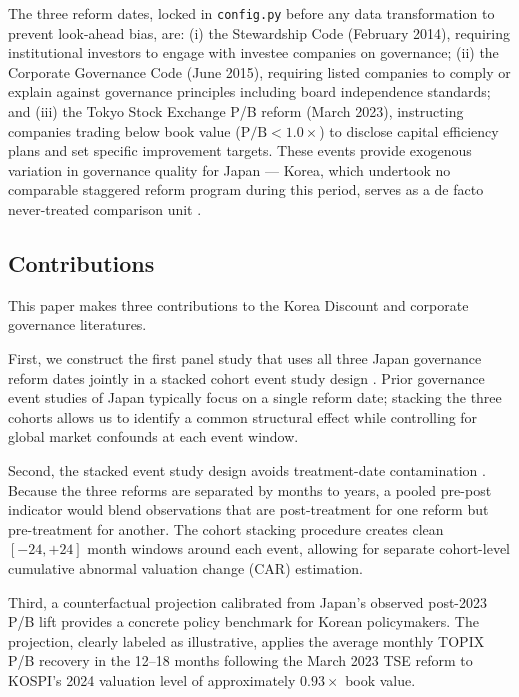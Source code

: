 \documentclass[12pt]{article}
\begin{document}
The three reform dates, locked in \texttt{config.py} before any data transformation to
prevent look-ahead bias, are: (i) the Stewardship Code (February 2014), requiring
institutional investors to engage with investee companies on governance; (ii) the Corporate
Governance Code (June 2015), requiring listed companies to comply or explain against
governance principles including board independence standards; and (iii) the Tokyo Stock
Exchange P/B reform (March 2023), instructing companies trading below book value ($\text{P/B} < 1.0\times$)
to disclose capital efficiency plans and set specific improvement targets. These events provide
exogenous variation in governance quality for Japan --- Korea, which undertook no comparable
staggered reform program during this period, serves as a de facto never-treated comparison
unit \citep{abadie2010, cengiz2019}.

\subsection*{Contributions}

This paper makes three contributions to the Korea Discount and corporate governance
literatures.

First, we construct the first panel study that uses all three Japan governance reform dates
jointly in a stacked cohort event study design \citep{cengiz2019}. Prior governance event
studies of Japan typically focus on a single reform date; stacking the three cohorts allows
us to identify a common structural effect while controlling for global market confounds at
each event window.

Second, the stacked event study design avoids treatment-date contamination \citep{baker2022}.
Because the three reforms are separated by months to years, a pooled pre-post indicator
would blend observations that are post-treatment for one reform but pre-treatment for another.
The cohort stacking procedure creates clean $[-24, +24]$ month windows around each event,
allowing for separate cohort-level cumulative abnormal valuation change (CAR) estimation.

Third, a counterfactual projection calibrated from Japan's observed post-2023 P/B lift
provides a concrete policy benchmark for Korean policymakers. The projection, clearly
labeled as illustrative, applies the average monthly TOPIX P/B recovery in the 12--18 months
following the March 2023 TSE reform to KOSPI's 2024 valuation level of approximately
$0.93\times$ book value.
\end{document}
